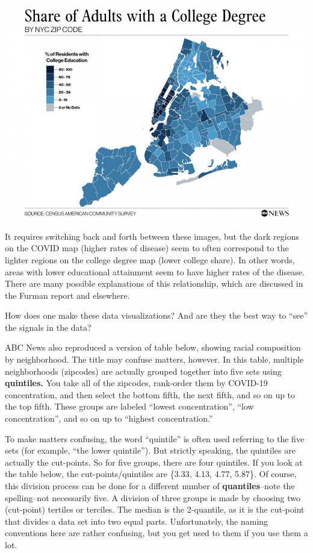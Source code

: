 \documentclass[openany]{book}
\begin{document}
\includegraphics{images/abc_CollegeDegreeNycZip_v02_KA_hpEmbed_17x12_992.jpg}

It requires switching back and forth between these images, but the dark regions on the COVID map (higher rates of disease) seem to often correspond to the lighter regions on the college degree map (lower college share). In other words, areas with lower educational attainment seem to have higher rates of the disease. There are many possible explanations of this relationship, which are discussed in the Furman report and elsewhere.

How does one make these data visualizations? And are they the best way to ``see'' the signals in the data?

ABC News also reproduced a version of table below, showing racial composition by neighborhood. The title may confuse matters, however. In this table, multiple neighborhoods (zipcodes) are actually grouped together into five sets using \textbf{quintiles.} You take all of the zipcodes, rank-order them by COVID-19 concentration, and then select the bottom fifth, the next fifth, and so on up to the top fifth. These groups are labeled ``lowest concentration'', ``low concentration'', and so on up to ``highest concentration.''

To make matters confusing, the word ``quintile'' is often used referring to the five sets (for example, ``the lower quintile''). But strictly speaking, the quintiles are actually the cut-points. So for five groups, there are four quintiles. If you look at the table below, the cut-points/quintiles are \{3.33, 4.13, 4.77, 5.87\}. Of course, this division process can be done for a different number of \textbf{quantiles}--note the spelling--not necessarily five. A division of three groups is made by choosing two (cut-point) tertiles or terciles. The median is the 2-quantile, as it is the cut-point that divides a data set into two equal parts. Unfortunately, the naming conventions here are rather confusing, but you get used to them if you use them a lot.
\end{document}
